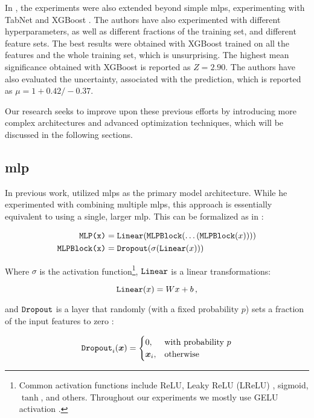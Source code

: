 In \jan, the experiments were also extended beyond simple \glspl{mlp}, experimenting with TabNet \cite{tabnet} and
XGBoost \cite{xgboost}. The authors have also experimented with different hyperparameters, as well as different
fractions of the training set, and different feature sets. The best results were obtained with XGBoost trained on all
the features and the whole training set, which is unsurprising. The highest mean significance obtained with XGBoost is
reported as $Z = 2.90$. The authors have also evaluated the uncertainty, associated with the prediction, which is
reported as $\mu = 1 + 0.42 /- 0.37$.






Our research seeks to improve upon these previous efforts by introducing more complex architectures and advanced
optimization techniques, which will be discussed in the following sections.

\subsection[MLP]{\gls{mlp}}

In previous work, \severin utilized \glspl{mlp} as the primary model architecture.
While he experimented with combining multiple \glspl{mlp}, this approach is essentially equivalent to using a single,
larger \gls{mlp}. This can be formalized as in \cite{ft-transformer}:

\begin{align}
    \texttt{MLP(x)}      & = \texttt{Linear}(\texttt{MLPBlock}(\dots(\texttt{MLPBlock}(x)))) \\
    \texttt{MLPBlock(x)} & = \texttt{Dropout}(\sigma(\texttt{Linear}(x)))
\end{align}

Where $\sigma$ is the activation function\footnote{Common activation functions include ReLU, Leaky ReLU (LReLU)
    \cite{relu, lrelu}, sigmoid, $\tanh$, and others. Throughout our experiments we mostly use GELU activation
    \cite{gelu}.},
$\texttt{Linear}$ is a linear transformations:

\begin{equation}
    \texttt{Linear}(x) = Wx + b\,,
\end{equation}

and $\texttt{Dropout}$ is a layer that randomly (with a fixed probability $p$) sets a fraction of the input features to
zero \cite{dropout}:

\begin{equation}
    \texttt{Dropout}_i({\boldsymbol{x}}) = \begin{cases}
        0,         & \text{with probability } p \\
        {\boldsymbol{x}}_i, & \text{otherwise}
    \end{cases}
\end{equation}